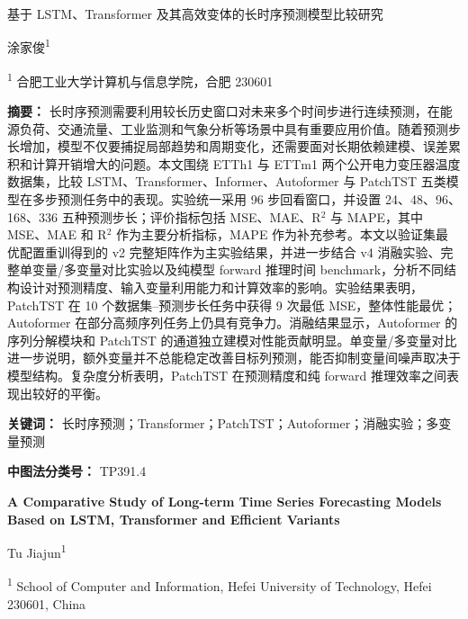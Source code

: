\documentclass[UTF8,a4paper,zihao=-4]{ctexart}
\begin{document}
\begin{center}
  {\heiti 基于 LSTM、Transformer 及其高效变体的长时序预测模型比较研究}\par
  \vspace{0.8em}
  { 涂家俊\textsuperscript{1}}\par
  \vspace{0.3em}
  {\textsuperscript{1} 合肥工业大学计算机与信息学院，合肥 230601}\par
\end{center}

\vspace{0.8em}

\noindent\textbf{摘\quad 要：}
长时序预测需要利用较长历史窗口对未来多个时间步进行连续预测，在能源负荷、交通流量、工业监测和气象分析等场景中具有重要应用价值。随着预测步长增加，模型不仅要捕捉局部趋势和周期变化，还需要面对长期依赖建模、误差累积和计算开销增大的问题。本文围绕 ETTh1 与 ETTm1 两个公开电力变压器温度数据集，比较 LSTM、Transformer、Informer、Autoformer 与 PatchTST 五类模型在多步预测任务中的表现。实验统一采用 96 步回看窗口，并设置 24、48、96、168、336 五种预测步长；评价指标包括 MSE、MAE、R$^2$ 与 MAPE，其中 MSE、MAE 和 R$^2$ 作为主要分析指标，MAPE 作为补充参考。本文以验证集最优配置重训得到的 v2 完整矩阵作为主实验结果，并进一步结合 v4 消融实验、完整单变量/多变量对比实验以及纯模型 forward 推理时间 benchmark，分析不同结构设计对预测精度、输入变量利用能力和计算效率的影响。实验结果表明，PatchTST 在 10 个数据集--预测步长任务中获得 9 次最低 MSE，整体性能最优；Autoformer 在部分高频序列任务上仍具有竞争力。消融结果显示，Autoformer 的序列分解模块和 PatchTST 的通道独立建模对性能贡献明显。单变量/多变量对比进一步说明，额外变量并不总能稳定改善目标列预测，能否抑制变量间噪声取决于模型结构。复杂度分析表明，PatchTST 在预测精度和纯 forward 推理效率之间表现出较好的平衡。

\vspace{0.4em}
\noindent\textbf{关键词：} 长时序预测；Transformer；PatchTST；Autoformer；消融实验；多变量预测

\vspace{0.4em}
\noindent\textbf{中图法分类号：} TP391.4

\vspace{1.4em}

\begin{center}
  {\bfseries A Comparative Study of Long-term Time Series Forecasting Models Based on LSTM, Transformer and Efficient Variants}\par
  \vspace{0.8em}
  { Tu Jiajun\textsuperscript{1}}\par
  \vspace{0.3em}
  {\textsuperscript{1} School of Computer and Information, Hefei University of Technology, Hefei 230601, China}\par
\end{center}
\end{document}
